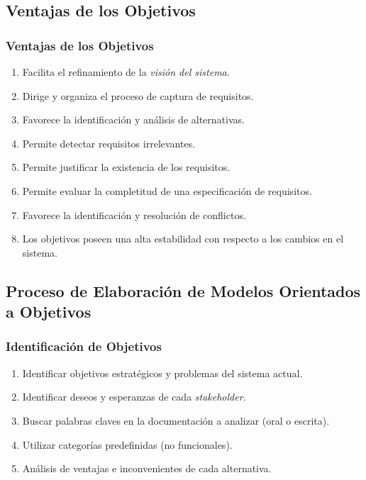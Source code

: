 \documentclass[handout,slidestop,xcolor=pst,dvips,blue]{beamer}
\begin{document}
\subsection{Ventajas de los Objetivos}

\begin{frame}[c]
    \frametitle{Ventajas de los Objetivos}
    \begin{enumerate}[<+->]
        \item Facilita el refinamiento de la \emph{visión del sistema}.
        \item Dirige y organiza el proceso de captura de requisitos.
        \item Favorece la identificación y análisis de alternativas.
        \item Permite detectar requisitos irrelevantes.
        \item Permite justificar la existencia de los requisitos.
        \item Permite evaluar la completitud de una especificación de requisitos.
        \item Favorece la identificación y resolución de conflictos.
        \item Los objetivos poseen una alta estabilidad con respecto a los cambios en el sistema.
    \end{enumerate}
\end{frame}


\subsection[Proceso de Modelado de Objetivos]{Proceso de Elaboración de Modelos Orientados a Objetivos}

\begin{frame}[c]
    \frametitle{Identificación de Objetivos}
    \begin{enumerate}[<+->]
         \item Identificar objetivos estratégicos y problemas del sistema actual.
         \item Identificar deseos y esperanzas de cada \emph{stakeholder}.
         \item Buscar palabras claves en la documentación a analizar (oral o escrita).
         \item Utilizar categorías predefinidas (no funcionales).
         \item Análisis de ventajas e inconvenientes de cada alternativa.
    \end{enumerate}
\end{frame}
\end{document}
